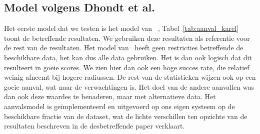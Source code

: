 \subsection{Model volgens Dhondt et al.}
Het eerste model dat we testen is het model van
\citeauthor{Dhondt}~\cite{Dhondt}, Tabel~\ref{tab:aanval_karel} toont de
betreffende resultaten. We gebruiken deze resultaten als referentie voor de
rest van de resultaten. Het model van~\citeauthor{Dhondt} heeft geen
restricties betreffende de beschikbare data, het kan dus alle data gebruiken.
Het is dan ook logisch dat dit resulteert in goeie scores. We zien hier dan ook
een hoge succes rate, die relatief weinig afneemt bij hogere radiussen. De rest
van de statistieken wijzen ook op een goeie aanval, wat naar de verwachtingen
is. Het doel van de andere aanvallen was dan ook deze waardes te benaderen,
maar met alternatieve data. Het aanvalsmodel is geïmplementeerd en uitgevoerd
op ons eigen systeem op de beschikbare fractie van de dataset, wat de lichte
verschillen ten opzichte van de resultaten beschreven in de desbetreffende
paper verklaart.


